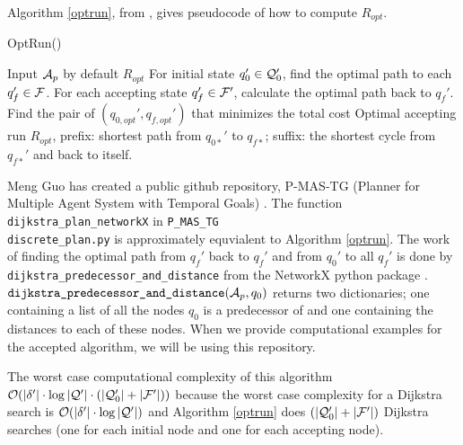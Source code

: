 Algorithm \ref{optrun}, from \cite{guo15}, gives pseudocode of how to compute $R_{opt}$.
\begin{algorithm}
\caption{OptRun()}\label{optrun}
\begin{algorithmic}[1]
\Require Input $\mathcal{A}_p$ by default
\Ensure $R_{opt}$
\State For initial state $q_0' \in \mathcal{Q}_0'$, find the optimal path to each $q_f' \in \mathcal{F}$.
\State For each accepting state $q_f' \in \mathcal{F}'$, calculate the optimal path back to $q_f'$. 
\State Find the pair of $(q_{0,opt}',q_{f,opt}')$ that minimizes the total cost
\State Optimal accepting run $R_{opt}$, prefix: shortest path from $q_{0*}'$ to  $q_{f*}$; suffix: the shortest cycle from $q_{f*}'$ and back to itself.
\end{algorithmic}
\end{algorithm}

Meng Guo has created a public github repository, P-MAS-TG (Planner for Multiple Agent System with Temporal Goals) \cite{pMasGit}. The function \texttt{dijkstra\_plan\_networkX} in \texttt{P\_MAS\_TG\\discrete\_plan.py} is approximately equvialent to Algorithm \ref{optrun}. The work of finding the optimal path from $q_f'$ back to $q_f'$ and from $q_0'$ to all $q_f'$ is done by \texttt{dijkstra\_predecessor\_and\_distance} from the NetworkX python package \cite{schult08}. $\texttt{dijkstra\_predecessor\_and\_distance}(\mathcal{A}_p,q_0)$ returns two dictionaries; one containing a list of all the nodes $q_0$ is a predecessor of and one containing the distances to each of these nodes. When we provide computational examples for the accepted algorithm, we will be using this repository. %


The worst case computational complexity of this algorithm $\mathcal{O}(|\delta'| \cdot \log|\mathcal{Q}'| \cdot (|\mathcal{Q}_0'| + |\mathcal{F}'|))$ because the worst case complexity for a Dijkstra search is $\mathcal{O}(|\delta'| \cdot \log|\mathcal{Q}'| )$ and Algorithm \ref{optrun} does $(|\mathcal{Q}_0'| + |\mathcal{F}'|)$ Dijkstra searches (one for each initial node and one for each accepting node).

